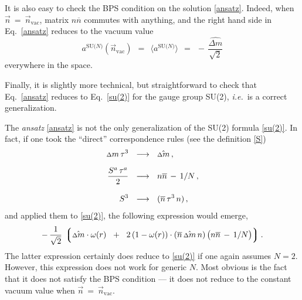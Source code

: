 \documentclass[12pt]{article}
\def\beq{\begin{equation}}
\def\eeq{\end{equation}}
\newcommand{\ov}{\overline}
\newcommand{\lgr}{\left\lgroup}
\newcommand{\rgr}{\right\rgroup}
\newcommand{\aN}{a^\text{SU($N$)}}
\newcommand{\nbar}{\ov{n}}
\newcommand{\nnbar}{n\ov{n}}
\newcommand{\dm}{\hat{{\scriptstyle \Delta} m}}
\newcommand{\deltam}{{\scriptstyle \Delta} m}
\newcommand{\nvac}{\vec{n}{}_\text{vac}}
\newcommand{\ie}{{\it i.e.}~}
\newcommand{\ansatz}{{\it ansatz} }
\begin{document}
	It is also easy to check the BPS condition on the solution \eqref{ansatz}.
	Indeed, when $ \vec{n} ~=~ \nvac $, matrix $ \nnbar $ commutes with anything,
	and the right hand side in Eq.~\eqref{ansatz} reduces to the vacuum value
\beq
	\aN (\nvac)    ~~=~~    \langle \aN \rangle    ~~=~~    -\, \frac{\dm}{\sqrt{2}}
\eeq
	everywhere in the space.

	Finally, it is slightly more technical, but straightforward to check that Eq.~\eqref{ansatz}
	reduces to Eq.~\eqref{su(2)} for the gauge group SU(2), \ie is a correct generalization.

	The \ansatz \eqref{ansatz} is not the only generalization of the SU(2) formula \eqref{su(2)}.
	In fact, if one took the ``direct'' correspondence rules (see the definition \eqref{S})
\begin{align}
%
\notag
	\deltam\, \tau^3    & ~~\longrightarrow~~    \dm\,,\\[2mm]
%
	\frac{S^a\, \tau^a}{2}    & ~~\longrightarrow~~    \nnbar \,-\, 1/N \,,\\[3mm]
%
\notag
	S^3    & ~~\longrightarrow~~     (\nbar\, \tau^3\, n)\,,
\end{align}
	and applied them to \eqref{su(2)}, the following expression would emerge,
\[
	-\, \frac{1}{\sqrt{2}}\, \lgr  \dm \cdot \omega(r)  \;~+~\;  
	2\, ( 1 - \omega(r) ) \cdot (\nbar\, \dm\, n) \, \big( \nnbar \,-\, 1/N \big) \rgr.
\]
	The latter expression certainly does reduce to \eqref{su(2)} if one  again assumes $ N = 2 $.
	However, this expression does not work for generic $N$.
	Most obvious is the fact that it does not satisfy the BPS condition ---
	it does not reduce to the constant vacuum value when $ \vec{n} ~=~ \nvac $.
\end{document}
